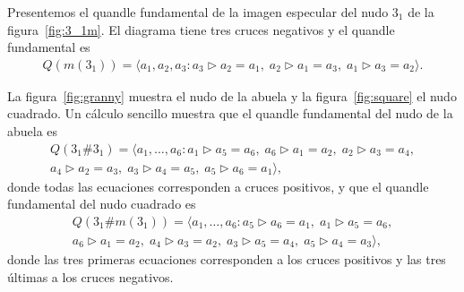 \documentclass[graybox]{svmult}
\begin{document}
	Presentemos el quandle fundamental de la imagen especular del nudo $3_1$ de
	la figura~\ref{fig:3_1m}. El diagrama tiene tres cruces negativos y el
	quandle fundamental es
	\begin{align*}
		Q(m(3_1))=\langle a_1,a_2,a_3:
		a_3\triangleright a_2=a_1,\;
		a_2\triangleright a_1=a_3,\;
		a_1\triangleright a_3=a_2\rangle.
	\end{align*}

    La figura~\ref{fig:granny} muestra el nudo de la abuela y la
    figura~\ref{fig:square} el nudo cuadrado.  Un cálculo sencillo muestra que 
    el quandle fundamental del nudo de la abuela es
    \begin{multline*}
		Q(3_1\#3_1)=\langle a_1,\dots,a_6:
        a_1\triangleright a_5=a_6,\;
        a_6\triangleright a_1=a_2,\;
        a_2\triangleright a_3=a_4,\\
		a_4\triangleright a_2=a_3,\;
        a_3\triangleright a_4=a_5,\;
        a_5\triangleright a_6=a_1\rangle,
	\end{multline*}
    donde todas las ecuaciones corresponden a cruces positivos, 
    y que el quandle fundamental del nudo cuadrado es
    \begin{multline}
		Q(3_1\#m(3_1))=\langle a_1,\dots,a_6:
        a_5\triangleright a_6=a_1,\;
		a_1\triangleright a_5=a_6,\\
        a_6\triangleright a_1=a_2,\;
        a_4\triangleright a_3=a_2,\;
		a_3\triangleright a_5=a_4,\;
        a_5\triangleright a_4=a_3\rangle,
    \end{multline}
    donde las tres primeras ecuaciones corresponden a los cruces positivos y
   	las tres últimas a los cruces negativos.
\end{document}
